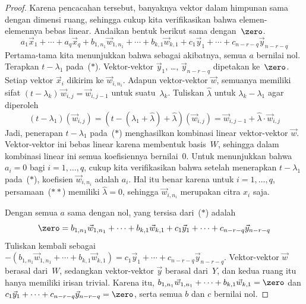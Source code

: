 \begin{proof}
Karena pencacahan tersebut, banyaknya vektor dalam himpunan
sama dengan dimensi ruang, sehingga
cukup kita verifikasikan bahwa elemen-elemennya bebas linear.
Andaikan bentuk berikut sama dengan~$\zero$.
\begin{equation*}
  a_1\vec{x}_1+\cdots+a_q\vec{x}_q   
    +b_{1,n_1}\vec{w}_{1,n_1}+\cdots+b_{k,1}\vec{w}_{k,1} 
    +c_1\vec{y}_1+\cdots+c_{n-r-q}\vec{y}_{n-r-q}
  \tag{$*$}
\end{equation*}
Pertama-tama kita menunjukkan bahwa sebagai akibatnya,
semua $a$ bernilai nol.
Terapkan $t-\lambda_1$ pada~($*$).
Vektor-vektor $\vec{y}_1$, \ldots, $\vec{y}_{n-r-q}$
dipetakan ke~$\zero$.
Setiap vektor $\vec{x}_i$ dikirim ke
$\vec{w}_{i,n_i}$.
Adapun vektor-vektor $\vec{w}$, semuanya memiliki sifat
$(t-\lambda_k)\,\vec{w}_{i,j}=\vec{w}_{i,j-1}$ 
untuk suatu~$\lambda_k$.
Tuliskan $\hat{\lambda}$ untuk $\lambda_k-\lambda_1$ agar diperoleh
\begin{equation*}
  (t-\lambda_1)(\vec{w}_{i,j})
    =(t-(\lambda_1+\hat{\lambda})+\hat{\lambda})(\vec{w}_{i,j})
    =\vec{w}_{i,j-1}+\hat{\lambda}\cdot\vec{w}_{i,j} 
  \tag{$**$}
\end{equation*}
Jadi, penerapan $t-\lambda_1$ pada~($*$) menghasilkan
kombinasi linear vektor-vektor $\vec{w}$.
Vektor-vektor ini bebas linear karena
membentuk basis~$W$, sehingga dalam kombinasi linear ini
semua koefisiennya bernilai~$0$.
Untuk menunjukkan bahwa $a_i=0$ bagi $i=1,\ldots,q$, cukup
kita verifikasikan bahwa setelah menerapkan $t-\lambda_1$ pada~($*$),
koefisien $\vec{w}_{i,n_i}$ adalah $a_i$.
Hal itu benar karena untuk $i=1,\ldots,q$,
persamaan~($**$) memiliki $\hat{\lambda}=0$,
sehingga $\vec{w}_{i,n_i}$ merupakan citra $x_{i}$ saja.

Dengan semua $a$ sama dengan nol, yang tersisa dari~($*$) adalah
\begin{equation*}
  \zero
  =
    b_{1,n_1}\vec{w}_{1,n_1}+\cdots+b_{k,1}\vec{w}_{k,1}
    +c_1\vec{y}_1+\cdots+c_{n-r-q}\vec{y}_{n-r-q}
\end{equation*}
Tuliskan kembali sebagai $-(b_{1,n_1}\vec{w}_{1,n_1}+\cdots+b_{k,1}\vec{w}_{k,1})=
    c_1\vec{y}_1+\cdots+c_{n-r-q}\vec{y}_{n-r-q}$.
Vektor-vektor $\vec{w}$ berasal dari~$W$, sedangkan vektor-vektor $\vec{y}$ berasal dari~$Y$,
dan kedua ruang itu hanya memiliki irisan trivial.
Karena itu, $b_{1,n_1}\vec{w}_{1,n_1}+\cdots+b_{k,1}\vec{w}_{k,1}=\zero$
dan $c_1\vec{y}_1+\cdots+c_{n-r-q}\vec{y}_{n-r-q}=\zero$,
serta semua $b$ dan $c$ bernilai nol.
\end{proof}




